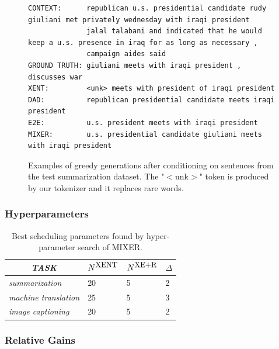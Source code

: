 \begin{figure}[h!]
{\begin{verbatim}
CONTEXT:      republican u.s. presidential candidate rudy giuliani met privately wednesday with iraqi president 
              jalal talabani and indicated that he would keep a u.s. presence in iraq for as long as necessary , 
              campaign aides said
GROUND TRUTH: giuliani meets with iraqi president , discusses war
XENT:         <unk> meets with president of iraqi president
DAD:          republican presidential candidate meets iraqi president
E2E:          u.s. president meets with iraqi president
MIXER:        u.s. presidential candidate giuliani meets with iraqi president
\end{verbatim}
}
\caption{Examples of greedy generations after conditioning on sentences from the test summarization dataset. The "$<$unk$>$" token is produced by our tokenizer and it replaces rare words.} 
\label{fig:generation}
\end{figure}


\subsubsection{Hyperparameters}
\begin{table}[!h]
\caption{Best scheduling parameters found by hyper-parameter search of MIXER.}
\begin{tabular}{l || l | l | l}
      \multicolumn{1}{c||}{\emph{TASK} }  & 
      \multicolumn{1}{c|}{$N^{\mbox{\small XENT}}$} & 
      \multicolumn{1}{c|}{$N^{\mbox{\small XE+R}}$} & \multicolumn{1}{c}{$\Delta$} \\
      \hline
      \hline
      {\em summarization} & 20 & 5 & 2  \\
      \hline
      {\em machine translation} & 25 & 5 & 3 \\
      \hline
      {\em image captioning} & 20 & 5 & 2  \\
    \end{tabular}
\label{tab:scheduling}
\end{table}

\subsubsection{Relative Gains}


